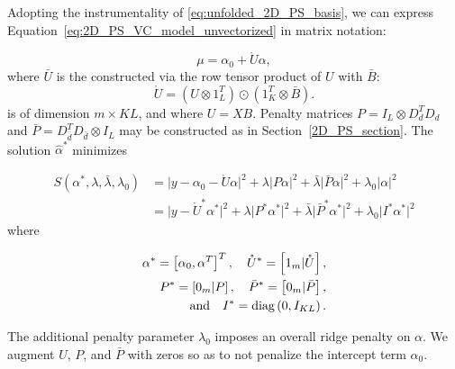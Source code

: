 \documentclass[12pt]{article}
\theoremstyle{definition}
\begin{document}
Adopting the instrumentality of \ref{eq:unfolded_2D_PS_basis}, we can express Equation~\ref{eq:2D_PS_VC_model_unvectorized} in matrix notation:

\[
\mu = \alpha_0 + \mathring{U} \alpha,
\]
\noindent
where $\bar{U}$ is the constructed via the row tensor product of $U$ with $\bar{B}$:
\begin{equation} \label{eq:2D_PS_VC_basis_vectorized}
\mathring{U} = \left( U \otimes 1^T_L \right) \odot \left( 1^T_K \otimes \bar{B} \right).
\end{equation}
\noindent
is of dimension $m \times KL$, and where $U = XB$. Penalty matrices $P = I_L \otimes D_d^T D_d$ and $\bar{P} = D_{\bar{d}}^T D_{\bar{d}} \otimes I_L$ may be constructed as in Section~\ref{2D_PS_section}. The solution $\hat{\alpha}^*$ minimizes

\begin{align} 
S\left(\alpha^*, \lambda,\bar{\lambda},\lambda_0\right) &= \vert y - \alpha_0 - \mathring{U} \alpha \vert^2 + \lambda \vert P \alpha \vert^2 +  \bar{\lambda} \vert \bar{P} \alpha \vert^2 +  \lambda_0 \vert  \alpha \vert^2 \nonumber\\
&= \vert y - \mathring{U}^* \alpha^* \vert^2 + \lambda \vert P^* \alpha^* \vert^2 +  \bar{\lambda} \vert \bar{P}^* \alpha^* \vert^2 +  \lambda_0 \vert I^* \alpha^* \vert^2 \label{eq:2D_VC_objective_function}
\end{align}
\noindent
where 

\begin{align*}
\alpha^* = \left[ \alpha_0, \alpha^T \right]^T, \quad \mathring{U}^* = \left[ 1_m \vert \mathring{U} \right],\\
 P^* = \left[ 0_m \vert P \right], \quad \bar{P}^* = \left[ 0_m \vert \bar{P} \right],\\
 \mbox{and} \quad I^* = \textup{diag}\left(0, I_{KL}\right).
\end{align*}

The additional penalty parameter $\lambda_0$ imposes an overall ridge penalty on $\alpha$. We augment $U$, $P$, and $\bar{P}$ with zeros so as to not penalize the intercept term $\alpha_0$.
\end{document}
